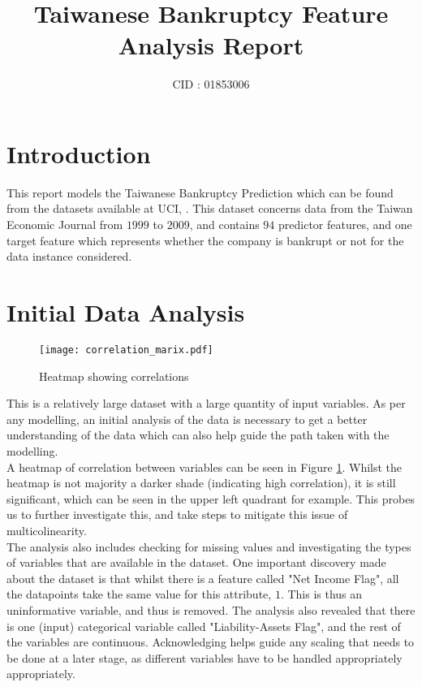 \documentclass[11pt]{article}
\title{Taiwanese Bankruptcy Feature Analysis Report}
\date{}
\author{CID : 01853006}
\begin{document}
\maketitle

\section{Introduction}

This report models the Taiwanese Bankruptcy Prediction which can be found from the datasets available at UCI, \cite{taiwanese_bankruptcy_dataset}. This dataset concerns data from the Taiwan Economic Journal from $1999$ to $2009$, and contains $94$ predictor features, and one target feature which represents whether the company is bankrupt or not for the data instance considered. 

\section{Initial Data Analysis}\label{EDA}
\begin{figure}
    \centering
    \texttt{[image: correlation\_marix.pdf]}
    \caption{Heatmap showing correlations}
    \label{fig:CorrelationMatrix}
\end{figure}
This is a relatively large dataset with a large quantity of input variables. As per any modelling, an initial analysis of the data is necessary to get a better understanding of the data which can also help guide the path taken with the modelling. \\

A heatmap of correlation between variables can be seen in Figure \ref{fig:CorrelationMatrix}. Whilst the heatmap is not majority a darker shade (indicating high correlation), it is still significant, which can be seen in the upper left quadrant for example. This probes us to further investigate this, and take steps to mitigate this issue of multicolinearity. \\

The analysis also includes checking for missing values and investigating the types of variables that are available in the dataset. One important discovery made about the dataset is that whilst there is a feature called "Net Income Flag", all the datapoints take the same value for this attribute, $1$. This is thus an uninformative variable, and thus is removed. The analysis also revealed that there is one (input) categorical variable called "Liability-Assets Flag", and the rest of the variables are continuous. Acknowledging helps guide any scaling that needs to be done at a later stage, as different variables have to be handled appropriately appropriately. \\
\end{document}
